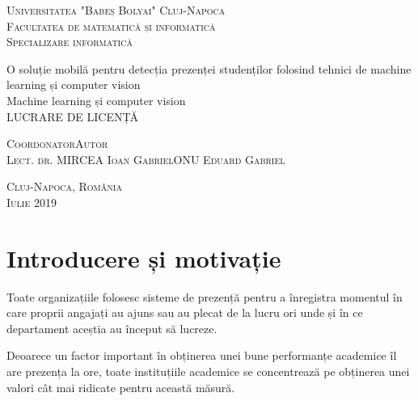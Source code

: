 \documentclass[a4paper, 12pt]{article}
\begin{document}
	\begin{titlepage}
		\begin{center}
			\vspace{0.5cm}
			\LARGE \textsc{Universitatea "Babeș Bolyai"}
			\LARGE \textsc{Cluj-Napoca}
			\\
			\vspace{0.5cm}
			\Large \textsc{Facultatea de matematică și informatică}
			\\
			\Large \textsc{Specializare informatică}
			
			
			\vspace{1.5cm}
			
			\Huge O soluție mobilă pentru detecția prezenței studenților folosind tehnici de machine learning și computer vision
			\\
			\bigskip
			\Large Machine learning și computer vision
			\\
			\vspace{0.5cm}		
			\Large LUCRARE DE LICENȚĂ
			
			\vfill
			
			\Large
			\textsc{Coordonator}\hfill \textsc{Autor}
			\\
			\large
			\textsc{Lect. dr. MIRCEA Ioan Gabriel}\hfill \textsc{ONU Eduard Gabriel}
			
			\vspace{1.5cm}
			\textsc{Cluj-Napoca, România}\\
			\textsc{Iulie 2019}
			
		\end{center}
	\end{titlepage}
	
	
	\restoregeometry
	
	\tableofcontents
	\newpage
	
	\listoffigures
	
	
	
	
	\newpage
	\section{Introducere și motivație}
	\bigskip
	\quad\space Toate organizațiile folosesc sisteme de prezență pentru a înregistra momentul în care proprii angajați au ajuns sau au plecat de la lucru ori unde și în ce departament aceștia au început să lucreze.
	
	Deoarece un factor important în obținerea unei bune performanțe academice îl are prezența la ore, toate instituțiile academice se concentrează pe obținerea unei valori cât mai ridicate pentru această măsură.
	
\end{document}
